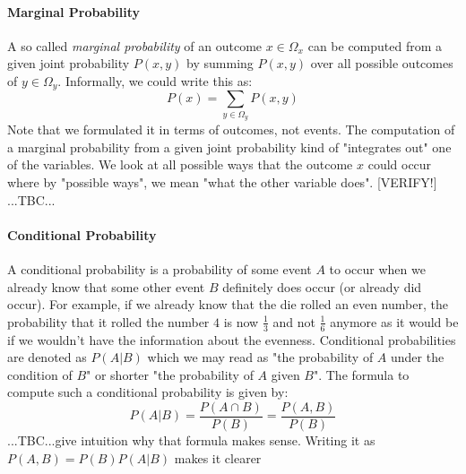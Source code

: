 % 





\paragraph{Marginal Probability}
A so called \emph{marginal probability} of an outcome $x \in \Omega_x$ can be computed from a given joint probability $P(x,y)$ by summing $P(x,y)$ over all possible outcomes of $y \in \Omega_y$. Informally, we could write this as:
\begin{equation}
P(x) = \sum_{y \in \Omega_y} P(x,y)
\end{equation}
Note that we formulated it in terms of outcomes, not events. The computation of a marginal probability from a given joint probability kind of "integrates out" one of the variables. We look at all possible ways that the outcome $x$ could occur where by "possible ways", we mean "what the other variable does". [VERIFY!] ...TBC...



\paragraph{Conditional Probability}
A conditional probability is a probability of some event $A$ to occur when we already know that some other event $B$ definitely does occur (or already did occur). For example, if we already know that the die rolled an even number, the probability that it rolled the number $4$ is now $\frac{1}{3}$ and not $\frac{1}{6}$ anymore as it would be if we wouldn't have the information about the evenness. Conditional probabilities are denoted as $P(A|B)$ which we may read as "the probability of $A$ under the condition of $B$" or shorter "the probability of $A$ given $B$". The formula to compute such a conditional probability is given by:
\begin{equation}
\label{Eq:ConditionalProbability}
 P(A|B) = \frac{P(A \cap B)}{P(B)} = \frac{P(A, B)}{P(B)}
\end{equation}
...TBC...give intuition why that formula makes sense. Writing it as $P(A,B) = P(B) P(A|B)$ makes it clearer



